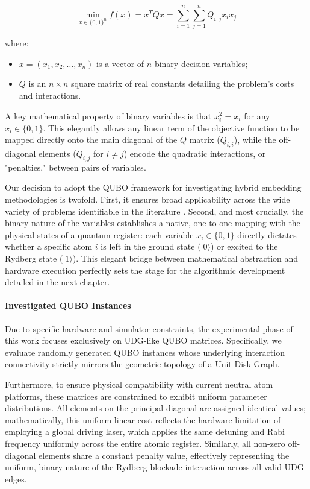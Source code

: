 \begin{equation}
    \min_{x \in \{0,1\}^n} f(x) = x^T Q x = \sum_{i=1}^{n} \sum_{j=1}^{n} Q_{i,j} x_i x_j
\end{equation}

where:
\begin{itemize}
    \item $x = (x_1, x_2, \dots, x_n)$ is a vector of $n$ binary decision variables;
    \item $Q$ is an $n \times n$ square matrix of real constants detailing the problem's costs and interactions.
\end{itemize}

A key mathematical property of binary variables is that $x_i^2 = x_i$ for any $x_i \in \{0,1\}$. This elegantly allows any linear term of the objective function to be mapped directly onto the main diagonal of the $Q$ matrix ($Q_{i,i}$), while the off-diagonal elements ($Q_{i,j}$ for $i \neq j$) encode the quadratic interactions, or "penalties," between pairs of variables.

Our decision to adopt the QUBO framework for investigating hybrid embedding methodologies is twofold. First, it ensures broad applicability across the wide variety of problems identifiable in the literature \cite{glover2018tutorial}. Second, and most crucially, the binary nature of the variables establishes a native, one-to-one mapping with the physical states of a quantum register: each variable $x_i \in \{0,1\}$ directly dictates whether a specific atom $i$ is left in the ground state ($|0\rangle$) or excited to the Rydberg state ($|1\rangle$). This elegant bridge between mathematical abstraction and hardware execution perfectly sets the stage for the algorithmic development detailed in the next chapter.

\paragraph{Investigated QUBO Instances}
Due to specific hardware and simulator constraints, the experimental phase of this work focuses exclusively on UDG-like QUBO matrices. Specifically, we evaluate randomly generated QUBO instances whose underlying interaction connectivity strictly mirrors the geometric topology of a Unit Disk Graph.

Furthermore, to ensure physical compatibility with current neutral atom platforms, these matrices are constrained to exhibit uniform parameter distributions. All elements on the principal diagonal are assigned identical values; mathematically, this uniform linear cost reflects the hardware limitation of employing a global driving laser, which applies the same detuning and Rabi frequency uniformly across the entire atomic register. Similarly, all non-zero off-diagonal elements share a constant penalty value, effectively representing the uniform, binary nature of the Rydberg blockade interaction across all valid UDG edges.

